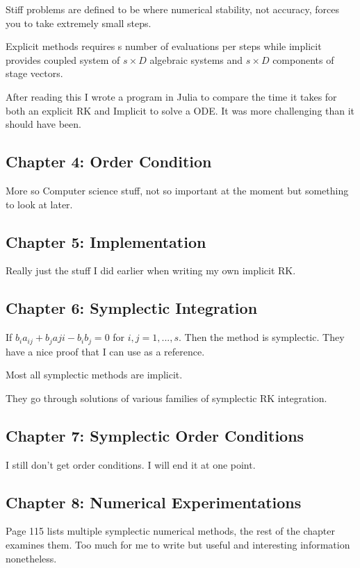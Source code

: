 Stiff problems are defined to be where numerical stability, not accuracy, forces you to take extremely small steps.

Explicit methods requires s number of evaluations per steps while implicit provides coupled system of $s \times D $ algebraic systems and $s \times D $ components of stage vectors.

After reading this I wrote a program in Julia to compare the time it takes for both an explicit RK and Implicit to solve a ODE. It was more challenging than it should have been.

\subsection{Chapter 4: Order Condition}

More so Computer science stuff, not so important at the moment but something to look at later.

\subsection{Chapter 5: Implementation}
Really just the stuff I did earlier when writing my own implicit RK.

\subsection{Chapter 6: Symplectic Integration}

If $ b_i a_{ij} + b_j a{ji} - b_i b_j = 0 $ for $i,j = 1,...,s$. Then the method is symplectic. They have a nice proof that I can use as a reference.

Most all symplectic methods are implicit.

They go through solutions of various families of symplectic RK integration.

\subsection{Chapter 7: Symplectic Order Conditions}

I still don't get order conditions. I will end it at one point.

\subsection{Chapter 8: Numerical Experimentations}

Page 115 lists multiple symplectic numerical methods, the rest of the chapter examines them. Too much for me to write but useful and interesting
information nonetheless.

